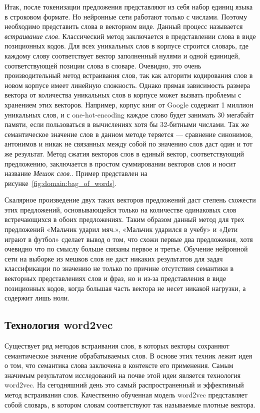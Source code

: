 Итак, после токенизации предложения представляют из себя набор единиц языка в строковом формате. Но нейронные сети работают только с числами. Поэтому необходимо представить слова в векторном виде. Данный процесс называется \textit{встраивание слов}. Классический метод  заключается в представлении слова в виде позиционных кодов. Для всех уникальных слов в корпусе строится словарь, где каждому слову соответствует вектор заполненный нулями и одной единицей, соответствующей позиции слова в словаре. Очевидно, это очень производительный метод встраивания слов, так как алгоритм кодирования слов в новом корпусе имеет линейную сложность. Однако прямая зависимость размера вектора от количества уникальных слов в корпусе может вызвать проблемы с хранением этих векторов. Например, корпус книг от Google содержит 1 миллион уникальных слов, и с one-hot-encoding каждое слово будет занимать 30 мегабайт памяти, если пользоваться в вычислениях хотя бы 32-битными числами. Так же семантическое значение слов в данном методе теряется --- сравнение синонимов, антонимов и никак не связанных между собой по значению слов даст один и тот же результат. Метод сжатия векторов слов в единый вектор, соответствующий предложению, заключается в простом суммировании векторов слов и носит название \textit{Мешок слов}.\cite{Goodfellow-et-al-2016}. Пример представлен на рисунке~\ref{fig:domain:bag_of_words}.

Скалярное произведение двух таких векторов предложений даст степень схожести этих предложений, основывающейся только на количестве одинаковых слов встречающихся в обоих предложениях. Таким образом данный метод для трех предложений «Мальчик ударил мяч.», «Мальчик ударился в учебу» и «Дети играют в футбол» сделает вывод о том, что схожи первые два предложения, хотя очевидно что по смыслу больше связаны первое и третье. Обучение нейронной сети на выборке из мешков слов не даст никаких результатов для задач классификации по значению не только по причине отсутствия семантики в векторных представлениях слов и фраз, но и из-за представления в виде позиционных кодов, когда большая часть вектора не несет никакой нагрузки, а содержит лишь ноли\cite{Goodfellow-et-al-2016}.
\subsection{Технология word2vec}\label{subsec:domain:domain_word2vec}
Существует ряд методов встраивания слов, в которых векторы сохраняют семантическое значение обрабатываемых слов. В основе этих техник лежит идея о том, что семантика слова заключена в контексте его применения. Самым значимым результатом исследований на почве этой идеи является технология word2vec. На сегодняшний день это самый распространенный и эффективный метод встраивания слов. Качественно обученная модель word2vec представляет собой словарь, в котором словам соответствуют так называемые плотные вектора\cite{word2vec}.

